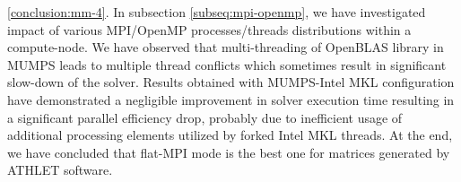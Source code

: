 

	
\ref{conclusion:mm-4}. In subsection \ref{subseq:mpi-openmp}, we have investigated impact of various MPI/OpenMP processes/threads distributions within a compute-node. We have observed that multi-threading of OpenBLAS library in MUMPS leads to multiple thread conflicts which sometimes result in significant slow-down of the solver. Results obtained with MUMPS-Intel MKL configuration have demonstrated a negligible improvement in solver execution time resulting in a significant parallel efficiency drop, probably due to inefficient usage of additional processing elements utilized by forked Intel MKL threads. At the end, we have concluded that flat-MPI mode is the best one for matrices generated by ATHLET software.\\










